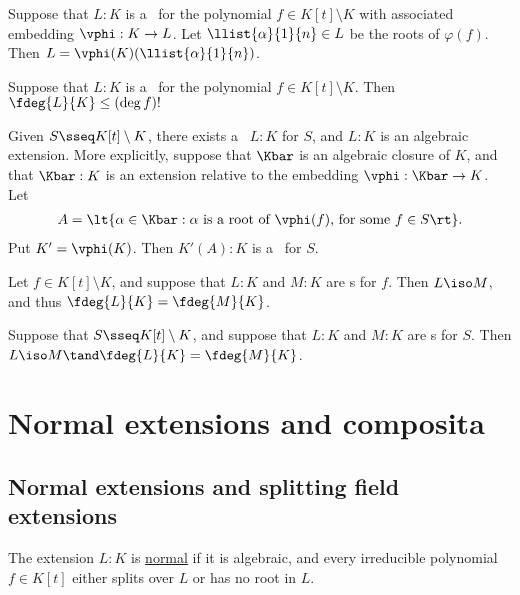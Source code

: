 \documentclass{article}
\begin{document}
  \begin{tproposition}
    Suppose that \( L:K \) is a \sfe~for the polynomial \( f\in K[t]\setminus K \) with associated embedding \( \vphi:K\to L \).
    Let \( \llist{\alpha}{1}{n}\in L \) be the roots of \( \varphi(f) \).
    Then \( L=\vphi(K)(\llist{\alpha}{1}{n}) \).
  \end{tproposition}

  \begin{tproposition}
    Suppose that \( L:K \) is a \sfe~for the polynomial \( f\in K[t]\setminus K \).
    Then \( \fdeg{L}{K}\leq (\deg f)! \)
  \end{tproposition}

  \begin{tproposition}
    Given \( S\sseq K[t]\setminus K \), there exists a \sfe~\( L:K \) for \( S \), and \( L:K \) is an algebraic extension.
    More explicitly, suppose that \( \Kbar \) is an algebraic closure of \( K \), and that \( \Kbar:K \) is an extension relative to the embedding \( \vphi:\Kbar\to K \).
    Let
    \begin{align*}
      A=\lt\{ \alpha\in \Kbar : \alpha\text{ is a root of \( \vphi(f) \), for some } f\in S \rt\}.
    \end{align*}
    Put \( K'=\vphi(K) \).
    Then \( K'(A):K \) is a \sfe~for \( S \).
  \end{tproposition}

  \begin{ttheorem}
    Let \( f\in K[t]\setminus K \), and suppose that \( L:K \) and \( M:K \) are \sfe s for \( f \).
    Then \( L\iso M \), and thus \( \fdeg{L}{K}=\fdeg{M}{K} \).
  \end{ttheorem}

  \begin{ttheorem}
    Suppose that \( S\sseq K[t]\setminus K \), and suppose that \( L:K \) and \( M:K \) are \sfe s for \( S \).
    Then \( L\iso M\tand \fdeg{L}{K}=\fdeg{M}{K} \).
  \end{ttheorem}

\section{Normal extensions and composita}
\subsection{Normal extensions and splitting field extensions}
  \begin{tdefinition}
    The extension \( L:K \) is \ul{normal} if it is algebraic, and every irreducible polynomial \( f\in K[t] \) either splits over \( L \) or has no root in \( L \).
  \end{tdefinition}
\end{document}
